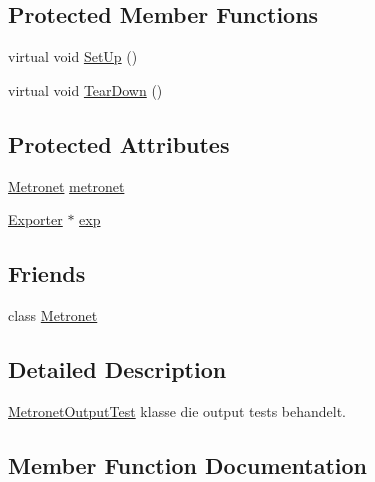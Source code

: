 \subsection*{Protected Member Functions}
\begin{DoxyCompactItemize}
\item 
virtual void \hyperlink{class_metronet_output_test_a591685e65362fe63b325e2d33189a3b0}{Set\+Up} ()
\item 
virtual void \hyperlink{class_metronet_output_test_a1390ab64ffdb3c5da39c4b27b40c170a}{Tear\+Down} ()
\end{DoxyCompactItemize}
\subsection*{Protected Attributes}
\begin{DoxyCompactItemize}
\item 
\hyperlink{class_metronet}{Metronet} \hyperlink{class_metronet_output_test_aaa6f34ee762d128cd8aea8c895bb46e4}{metronet}
\item 
\hyperlink{class_exporter}{Exporter} $\ast$ \hyperlink{class_metronet_output_test_ace0d26029b129b05d3846365c56d42ee}{exp}
\end{DoxyCompactItemize}
\subsection*{Friends}
\begin{DoxyCompactItemize}
\item 
class \hyperlink{class_metronet_output_test_a07c94fb69880743e62f64a941fc2d4ab}{Metronet}
\end{DoxyCompactItemize}


\subsection{Detailed Description}
\hyperlink{class_metronet_output_test}{Metronet\+Output\+Test} klasse die output tests behandelt. 

\subsection{Member Function Documentation}
\mbox{\label{class_metronet_output_test_a591685e65362fe63b325e2d33189a3b0}} 
